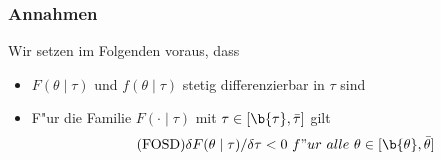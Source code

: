 \begin{frame}
\frametitle{Annahmen}
\justifying
Wir setzen im Folgenden voraus, dass
\begin{itemize}
    \item $F(\theta \mid \tau)$ und $f(\theta \mid \tau)$ stetig differenzierbar in $\tau$ sind
    \item F"ur die Familie $F( \cdot \mid \tau)$ mit $\tau \in [ \b{\tau} , \bar{\tau} ]$ gilt
    \begin{equation}
      \tag{FOSD}
      \delta F(\theta \mid \tau)/ \delta \tau < 0 \ f"ur \ alle \ \theta \in [ \b{\theta} , \bar{\theta} ]
    \end{equation}
  \end{itemize}
\end{frame}
